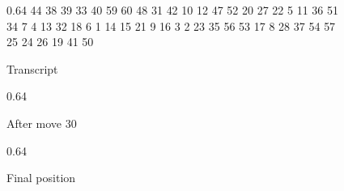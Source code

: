 \documentclass[a4paper,12pt]{book}
\newcommand{\scalefactorthreeup}{0.64}
\begin{document}
\begin{figure}[h!]
\begin{center}
\begin{minipage}[t]{.32\textwidth}
\begin{othelloboard}{\scalefactorthreeup}
\dotmarkings
{}
	{44}	{38}	{39}	{33}	{40}	{59}	{60}
	{48}	{31}	{42}	{10}	{12}	{47}	{52}
	{20}	{27}	{22}	{5}	{11}	{36}	{51}
	{34}	{7}	{}	{}	{4}	{13}	{32}
	{18}	{6}	{}	{}	{1}	{14}	{15}
	{21}	{9}	{16}	{3}	{2}	{23}	{35}
	{56}	{53}	{17}	{8}	{28}	{37}	{54}
	{57}	{25}	{24}	{26}	{19}	{41}	{50}
\end{othelloboard}
\caption{Transcript}
\end{minipage}
\hfill
\begin{minipage}[t]{.32\textwidth}
\begin{othelloboard}{\scalefactorthreeup}
\dotmarkings
{}
\end{othelloboard}
\caption{After move 30}
\end{minipage}
\hfill
\begin{minipage}[t]{.32\textwidth}
\begin{othelloboard}{\scalefactorthreeup}
\dotmarkings
{}
\end{othelloboard}
\caption{Final position}
\end{minipage}
\end{center}
\end{figure}
\end{document}
